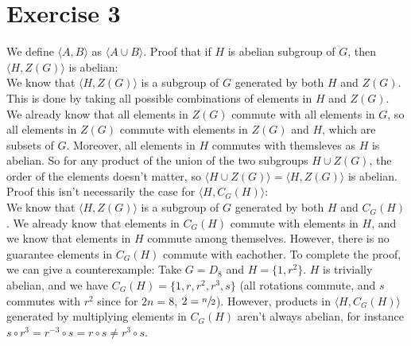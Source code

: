 \documentclass{article}
\begin{document}
    
    \section*{Exercise 3}
    We define $\langle A, B \rangle$ as $\langle A \cup B \rangle$.
    Proof that if $H$ is abelian subgroup of $G$,
    then $\langle H, Z(G) \rangle$ is abelian: \\
    We know that $\langle H, Z(G) \rangle$
    is a subgroup of $G$ generated by both $H$ and $Z(G)$.
    This is done by taking all possible combinations
    of elements in $H$ and $Z(G)$.
    We already know that all elements in $Z(G)$
    commute with all elements in $G$,
    so all elements in $Z(G)$ commute with elements in $Z(G)$
    and $H$,
    which are subsets of $G$.
    Moreover, all elements in $H$ commutes with themsleves
    as $H$ is abelian.
    So for any product of the union of the two subgroups $H \cup Z(G)$,
    the order of the elements doesn't matter,
    so $\langle H \cup Z(G) \rangle = \langle H, Z(G) \rangle$
    is abelian. \\
    Proof this isn't necessarily the case for $\langle H, C_G(H) \rangle$: \\
    We know that $\langle H, Z(G) \rangle$
    is a subgroup of $G$ generated by both $H$ and $C_G(H)$.
    We already know that elements in $C_G(H)$ commute with elements
    in $H$,
    and we know that elements in $H$ commute among themselves.
    However, there is no guarantee elements in $C_G(H)$
    commute with eachother.
    To complete the proof, we can give a counterexample:
    Take $G = D_8$ and $H = \{1, r^2\}$.
    $H$ is trivially abelian,
    and we have $C_G(H) = \{1, r, r^2, r^3, s\}$
    (all rotations commute, and $s$ commutes with $r^2$
    since for $2n = 8$, $2 = \sfrac{n}{2}$).
    However, products in $\langle H, C_G(H) \rangle$
    generated by multiplying elements in $C_G(H)$ aren't always abelian,
    for instance
    $s \circ r^3 = r^{-3} \circ s = r \circ s \neq r^3 \circ s$.
\end{document}

